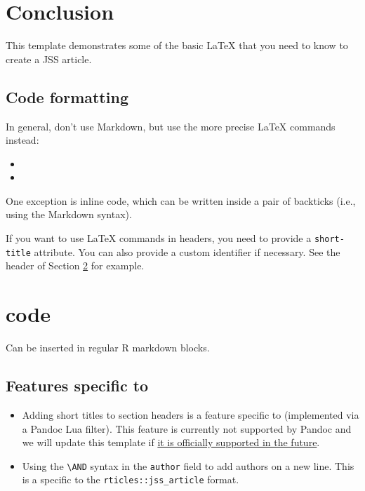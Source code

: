 \documentclass[
]{jss}
\providecommand{\tightlist}{%
  \setlength{\itemsep}{0pt}\setlength{\parskip}{0pt}}
\begin{document}
\hypertarget{conclusion}{%
\section{Conclusion}\label{conclusion}}

This template demonstrates some of the basic LaTeX that you need to know
to create a JSS article.

\hypertarget{code-formatting}{%
\subsection{Code formatting}\label{code-formatting}}

In general, don't use Markdown, but use the more precise LaTeX commands
instead:

\begin{itemize}
\item
\item
\end{itemize}

One exception is inline code, which can be written inside a pair of
backticks (i.e., using the Markdown syntax).

If you want to use LaTeX commands in headers, you need to provide a
\texttt{short-title} attribute. You can also provide a custom identifier
if necessary. See the header of Section \ref{r-code} for example.

\section[R code]{ code}\label{r-code}

Can be inserted in regular R markdown blocks.

\subsection[Features specific to rticles]{Features specific to
}\label{features-specific-to}

\begin{itemize}
\tightlist
\item
  Adding short titles to section headers is a feature specific to
   (implemented via a Pandoc Lua filter). This feature is
  currently not supported by Pandoc and we will update this template if
  \href{https://github.com/jgm/pandoc/issues/4409}{it is officially
  supported in the future}.
\item
  Using the \texttt{\textbackslash{}AND} syntax in the \texttt{author}
  field to add authors on a new line. This is a specific to the
  \texttt{rticles::jss\_article} format.
\end{itemize}
\end{document}

